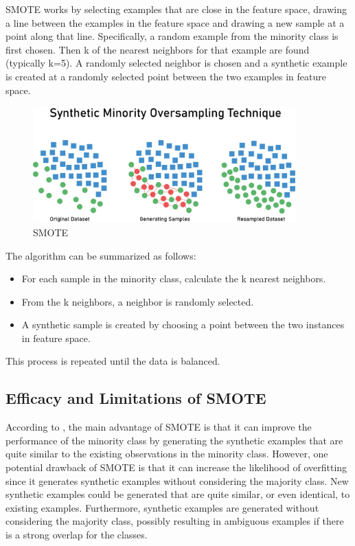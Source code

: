 \documentclass[12pt]{report}
\begin{document}
\newpage
SMOTE works by selecting examples that are close in the feature space, drawing a line between the examples in the feature space and drawing a new sample at a point along that line. Specifically, a random example from the minority class is first chosen. Then k of the nearest neighbors for that example are found (typically k=5). A randomly selected neighbor is chosen and a synthetic example is created at a randomly selected point between the two examples in feature space.

\begin{figure}[hbt!]
    \centering
    \includegraphics[width=0.9\textwidth]{./figures/smote.png}
    \caption{SMOTE}
    \label{fig:SMOTE}
\end{figure}

The algorithm can be summarized as follows:
\begin{itemize}
    \item For each sample in the minority class, calculate the k nearest neighbors.
    \item From the k neighbors, a neighbor is randomly selected.
    \item A synthetic sample is created by choosing a point between the two instances in
          feature space.
\end{itemize}

This process is repeated until the data is balanced.

\subsection*{Efficacy and Limitations of SMOTE}

According to \cite{fernandez2018smote}, the main advantage of SMOTE is that it
can improve the performance of the minority class by generating the synthetic
examples that are quite similar to the existing observations in the minority
class. However, one potential drawback of SMOTE is that it can increase the
likelihood of overfitting since it generates synthetic examples without
considering the majority class. New synthetic examples could be generated that
are quite similar, or even identical, to existing examples. Furthermore,
synthetic examples are generated without considering the majority class,
possibly resulting in ambiguous examples if there is a strong overlap for the
classes.
\end{document}

